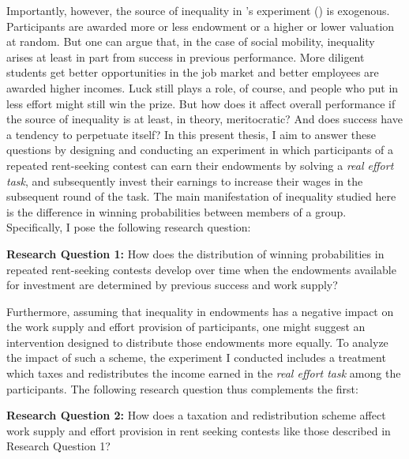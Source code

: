 Importantly, however, the source of inequality in \citeauthor{fallucchi2017}'s experiment (\citeyear{fallucchi2017}) is exogenous. Participants are awarded more or less endowment or a higher or lower valuation at random. But one can argue that, in the case of social mobility, inequality arises at least in part from success in previous performance. More diligent students get better opportunities in the job market and better employees are awarded higher incomes. Luck still plays a role, of course, and people who put in less effort might still win the prize. But how does it affect overall performance if the source of inequality is at least, in theory, meritocratic? And does success have a tendency to perpetuate itself? In this present thesis, I aim to answer these questions by designing and conducting an experiment in which participants of a repeated rent-seeking contest can earn their endowments by solving a \textit{real effort task}, and subsequently invest their earnings to increase their wages in the subsequent round of the task. The main manifestation of inequality studied here is the difference in winning probabilities between members of a group. Specifically, I pose the following research question:\\ 


\begin{tcolorbox}[colback=UniVieGrau!15!white, colframe=white] 
\textbf{Research Question 1:} How does the distribution of winning probabilities in repeated rent-seeking contests develop over time when the endowments available for investment are determined by previous success and work supply?
\end{tcolorbox}

Furthermore, assuming that inequality in endowments has a negative impact on the work supply and effort provision of participants, one might suggest an intervention designed to distribute those endowments more equally. To analyze the impact of such a scheme, the experiment I conducted includes a treatment which taxes and redistributes the income earned in the \textit{real effort task} among the participants. The following research question thus complements the first:\\

\begin{tcolorbox}[colback=UniVieGrau!15!white, colframe=white] 
\textbf{Research Question 2:} How does a taxation and redistribution scheme affect work supply and effort provision in rent seeking contests like those described in Research Question 1?
\end{tcolorbox}

